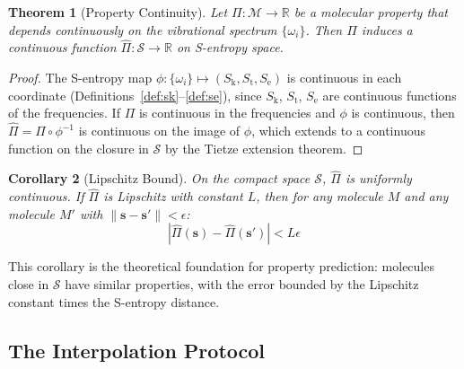 \documentclass[11pt,twocolumn,a4paper]{article}
\newtheorem{theorem}{Theorem}[section]
\newtheorem{corollary}[theorem]{Corollary}
\theoremstyle{definition}
\theoremstyle{remark}
\newcommand{\Sk}{S_{\mathrm{k}}}
\newcommand{\St}{S_{\mathrm{t}}}
\newcommand{\Se}{S_{\mathrm{e}}}
\newcommand{\Sspace}{\mathcal{S}}
\newcommand{\Real}{\mathbb{R}}
\begin{document}
\begin{theorem}[Property Continuity]
\label{thm:property_continuity}
Let $\Pi: \mathcal{M} \to \Real$ be a molecular property that depends continuously on the vibrational spectrum $\{\omega_i\}$. Then $\Pi$ induces a continuous function $\hat{\Pi}: \Sspace \to \Real$ on S-entropy space.
\end{theorem}

\begin{proof}
The S-entropy map $\phi: \{\omega_i\} \mapsto (\Sk, \St, \Se)$ is continuous in each coordinate (Definitions~\ref{def:sk}--\ref{def:se}), since $\Sk$, $\St$, $\Se$ are continuous functions of the frequencies. If $\Pi$ is continuous in the frequencies and $\phi$ is continuous, then $\hat{\Pi} = \Pi \circ \phi^{-1}$ is continuous on the image of $\phi$, which extends to a continuous function on the closure in $\Sspace$ by the Tietze extension theorem.
\end{proof}

\begin{corollary}[Lipschitz Bound]
\label{cor:lipschitz}
On the compact space $\Sspace$, $\hat{\Pi}$ is uniformly continuous. If $\hat{\Pi}$ is Lipschitz with constant $L$, then for any molecule $M$ and any molecule $M'$ with $\|\mathbf{s} - \mathbf{s}'\| < \epsilon$:
\begin{equation}
|\hat{\Pi}(\mathbf{s}) - \hat{\Pi}(\mathbf{s}')| < L \epsilon
\label{eq:lipschitz}
\end{equation}
\end{corollary}

This corollary is the theoretical foundation for property prediction: molecules close in $\Sspace$ have similar properties, with the error bounded by the Lipschitz constant times the S-entropy distance.

\subsection{The Interpolation Protocol}
\end{document}
